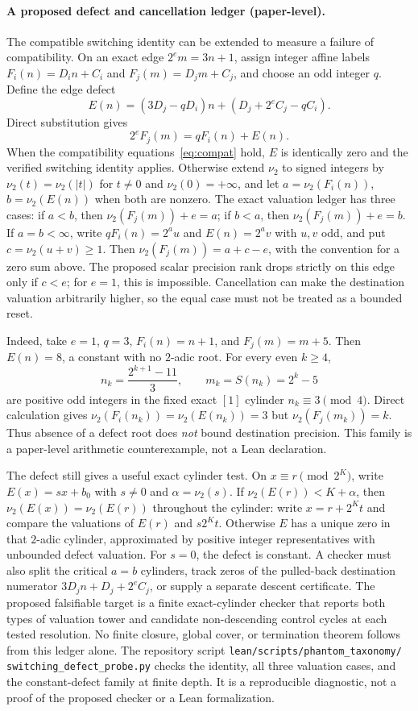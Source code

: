 \documentclass[11pt,a4paper]{article}
\newcommand{\nuTwo}{\nu_2}
\theoremstyle{definition}
\begin{document}
\paragraph{A proposed defect and cancellation ledger (paper-level).}
The compatible switching identity can be extended to measure a failure
of compatibility. On an exact edge $2^e m=3n+1$, assign integer affine
labels $F_i(n)=D_i n+C_i$ and $F_j(m)=D_j m+C_j$, and choose an odd
integer $q$. Define the edge defect
\[
  E(n)=(3D_j-qD_i)n+(D_j+2^e C_j-qC_i).
\]
Direct substitution gives
\[
  2^e F_j(m)=qF_i(n)+E(n).
\]
When the compatibility equations~\eqref{eq:compat} hold, $E$ is
identically zero and the verified switching identity applies. Otherwise
extend $\nuTwo$ to signed integers by
$\nuTwo(t)=\nuTwo(|t|)$ for $t\ne0$ and $\nuTwo(0)=+\infty$, and let
$a=\nuTwo(F_i(n))$, $b=\nuTwo(E(n))$ when both are nonzero. The exact
valuation ledger has three cases: if $a<b$, then
$\nuTwo(F_j(m))+e=a$; if $b<a$, then
$\nuTwo(F_j(m))+e=b$. If $a=b<\infty$, write
$qF_i(n)=2^a u$ and $E(n)=2^a v$ with $u,v$ odd, and put
$c=\nuTwo(u+v)\ge1$. Then
$\nuTwo(F_j(m))=a+c-e$, with the convention for a zero sum above.
The proposed scalar precision rank drops strictly on this edge only if
$c<e$; for $e=1$, this is impossible. Cancellation can make the
destination valuation arbitrarily higher, so the equal case must not
be treated as a bounded reset.

Indeed, take $e=1$, $q=3$, $F_i(n)=n+1$, and $F_j(m)=m+5$. Then
$E(n)=8$, a constant with no $2$-adic root. For every even $k\ge4$,
\[
  n_k=\frac{2^{k+1}-11}{3},\qquad
  m_k=S(n_k)=2^k-5
\]
are positive odd integers in the fixed exact $[1]$ cylinder
$n_k\equiv3\pmod4$. Direct
calculation gives
$\nuTwo(F_i(n_k))=\nuTwo(E(n_k))=3$ but
$\nuTwo(F_j(m_k))=k$. Thus absence of a defect root does \emph{not}
bound destination precision. This family is a paper-level arithmetic
counterexample, not a Lean declaration.

The defect still gives a useful exact cylinder test. On
$x\equiv r\pmod{2^K}$, write $E(x)=sx+b_0$ with $s\ne0$ and
$\alpha=\nuTwo(s)$. If $\nuTwo(E(r))<K+\alpha$, then
$\nuTwo(E(x))=\nuTwo(E(r))$ throughout the cylinder: write
$x=r+2^K t$ and compare the valuations of $E(r)$ and $s2^K t$.
Otherwise $E$
has a unique zero in that $2$-adic cylinder, approximated by positive
integer representatives with unbounded defect valuation. For $s=0$,
the defect is constant. A checker must also split the critical
$a=b$ cylinders, track zeros of the pulled-back destination numerator
$3D_j n+D_j+2^e C_j$, or supply a separate descent certificate. The
proposed falsifiable target is a finite exact-cylinder checker that
reports both types of valuation tower and candidate non-descending
control cycles at each tested resolution. No finite closure, global
cover, or termination theorem follows from this ledger alone.
The repository script \texttt{lean/scripts/phantom\_taxonomy/}
\texttt{switching\_defect\_probe.py} checks the identity, all three
valuation cases, and the constant-defect family at finite depth. It is
a reproducible diagnostic, not a proof of the proposed checker or a Lean
formalization.
\end{document}

